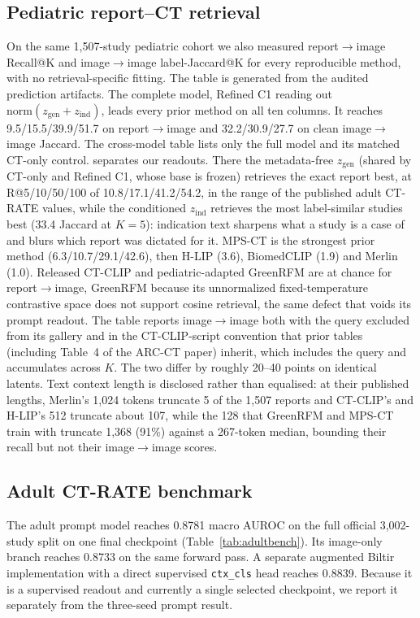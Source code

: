 \documentclass[10pt,twocolumn]{article}
\begin{document}
\subsection{Pediatric report--CT retrieval}
On the same 1,507-study pediatric cohort we also measured report$\rightarrow$image
Recall@K and image$\rightarrow$image label-Jaccard@K for every reproducible
method, with no retrieval-specific fitting. The table is generated from the
audited prediction artifacts. The complete model, Refined C1 reading out
$\mathrm{norm}(z_{\mathrm{gen}}{+}z_{\mathrm{ind}})$, leads every prior method on
all ten columns. It reaches 9.5/15.5/39.9/51.7 on report$\rightarrow$image and
32.2/30.9/27.7 on clean image$\rightarrow$image Jaccard. The cross-model table
lists only the full model and its matched CT-only control.
 separates our readouts. There the
metadata-free $z_{\mathrm{gen}}$ (shared by CT-only and Refined C1, whose base
is frozen) retrieves the exact report best, at R@5/10/50/100 of
10.8/17.1/41.2/54.2, in the range of the published adult CT-RATE values, while
the conditioned $z_{\mathrm{ind}}$ retrieves the most label-similar studies
best (33.4 Jaccard at $K{=}5$): indication text sharpens what a study is a case
of and blurs which report was dictated for it. MPS-CT is the strongest prior
method (6.3/10.7/29.1/42.6), then H-LIP (3.6), BiomedCLIP (1.9) and Merlin
(1.0). Released CT-CLIP
and pediatric-adapted GreenRFM are at chance for report$\rightarrow$image,
GreenRFM because its unnormalized fixed-temperature contrastive space does not
support cosine retrieval, the same defect that voids its prompt readout. The
table reports image$\rightarrow$image both with the query excluded from its
gallery and in the CT-CLIP-script convention that prior tables (including
Table~4 of the ARC-CT paper) inherit, which includes the query and accumulates
across $K$. The two differ by roughly 20--40 points on identical latents.
Text context length is disclosed rather than equalised: at their published
lengths, Merlin's 1,024 tokens truncate 5 of the 1,507 reports and CT-CLIP's
and H-LIP's 512 truncate about 107, while the 128 that GreenRFM and MPS-CT
train with truncate 1,368 (91\%) against a 267-token median, bounding their
recall but not their image$\rightarrow$image scores.

\subsection{Adult CT-RATE benchmark}
The adult prompt model reaches 0.8781 macro AUROC on the full official
3,002-study split on one final checkpoint (Table~\ref{tab:adultbench}). Its
image-only branch reaches 0.8733 on the same forward pass. A separate augmented Biltir
implementation with a direct supervised \texttt{ctx\_cls} head reaches 0.8839.
Because it is a supervised readout and currently a single selected checkpoint,
we report it separately from the three-seed prompt result.
\end{document}
